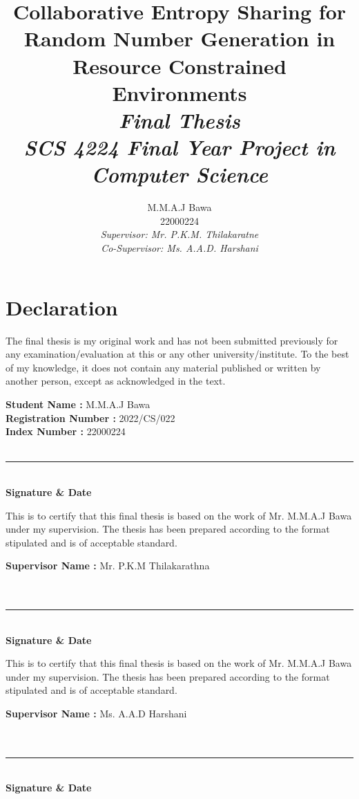 \documentclass[a4paper, 12pt]{article}
\title{Collaborative Entropy Sharing for Random Number Generation in Resource Constrained Environments\\
\vspace{5cm}
\large \emph{Final Thesis\\ SCS 4224 Final Year Project in Computer Science}\vspace{2cm}}
\author{M.M.A.J Bawa\\ 22000224\\
\textit{Supervisor: Mr. P.K.M. Thilakaratne}\\
\textit{Co-Supervisor: Ms. A.A.D. Harshani}
}
\begin{document}
\maketitle
\thispagestyle{empty}
\clearpage

\section*{Declaration}
The final thesis is my original work and has not been submitted previously for any examination/evaluation at this or any other university/institute. To the best of my knowledge, it does not contain any material published or written by another person, except as acknowledged in the text.

\vspace{.5cm}

\noindent
\textbf{Student Name :} M.M.A.J Bawa \\
\textbf{Registration Number :} 2022/CS/022\\
\textbf{Index Number :} 22000224
\\
\\
\rule{5cm}{0.15mm}\\
\textbf{Signature \& Date}

\vspace{.5cm}
\noindent
This is to certify that this final thesis is based on the work of Mr. M.M.A.J Bawa under my supervision. The thesis has been prepared according to the format stipulated and is of acceptable standard.

\vspace{.5cm}
\noindent
\textbf{Supervisor Name :} Mr. P.K.M Thilakarathna \\
\\
\\
\rule{5cm}{0.15mm}\\
\textbf{Signature \& Date}


\vspace{.5cm}
\noindent
This is to certify that this final thesis is based on the work of Mr. M.M.A.J Bawa under my supervision. The thesis has been prepared according to the format stipulated and is of acceptable standard.

\vspace{.5cm}
\noindent
\textbf{Supervisor Name :} Ms. A.A.D Harshani \\
\\
\\
\rule{5cm}{0.15mm}\\
\textbf{Signature \& Date}
\end{document}

